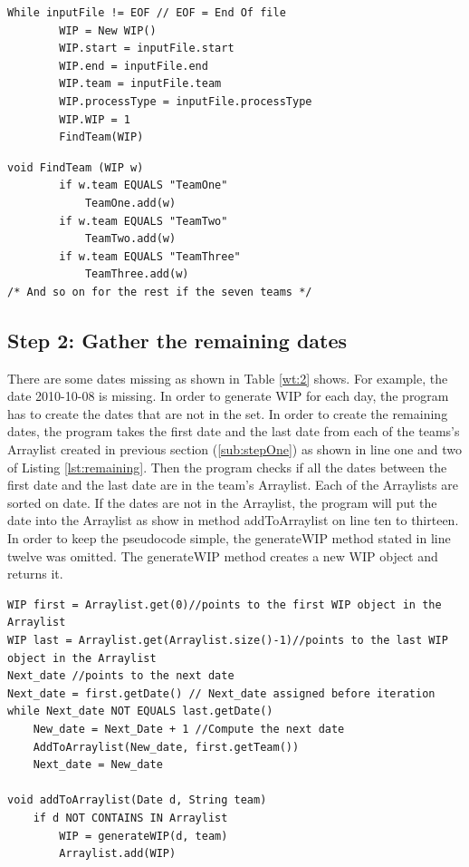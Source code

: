 \documentclass[UKenglish]{ifimaster}  %
\begin{document}
\begin{minipage}{\textwidth} 
 \begin{lstlisting}[caption={Gather all unique dates into Arraylist},label={lst:Arraylist}]
While inputFile != EOF // EOF = End Of file
		WIP = New WIP()
		WIP.start = inputFile.start
		WIP.end = inputFile.end
		WIP.team = inputFile.team
		WIP.processType = inputFile.processType
		WIP.WIP = 1
		FindTeam(WIP)
 \end{lstlisting}
 \end{minipage}

 
 \begin{lstlisting}[caption={Gather WIP object to the right data structure},label={lst:addWIP}]
void FindTeam (WIP w) 
		if w.team EQUALS "TeamOne"
			TeamOne.add(w)
		if w.team EQUALS "TeamTwo"
			TeamTwo.add(w)
		if w.team EQUALS "TeamThree"
			TeamThree.add(w)			
/* And so on for the rest if the seven teams */
 \end{lstlisting}
 
 \newpage
\subsection{Step 2: Gather the remaining dates}
 \label{sub:stepTwo}
There are some dates missing as shown in Table \ref{wt:2} shows. For example, the date 2010-10-08 is missing. In order to generate WIP for each day, the program has to create the dates that are not in the set. In order to create the remaining dates, the program takes the first date and the last date from each of the teams's Arraylist created in previous section (\ref{sub:stepOne}) as shown in line one and two of Listing \ref{lst:remaining}. Then the program checks if all the dates between the first date and the last date are in the team's Arraylist. Each of the Arraylists are sorted on date. If the dates are not in the Arraylist, the program will put the date into the Arraylist as show in method addToArraylist on line ten to thirteen.
In order to keep the pseudocode simple, the generateWIP method stated in line twelve was omitted. The generateWIP method creates a new WIP object and returns it.



\begin{lstlisting}[caption={Gather the remaining dates.},label={lst:remaining}]
WIP first = Arraylist.get(0)//points to the first WIP object in the Arraylist 
WIP last = Arraylist.get(Arraylist.size()-1)//points to the last WIP object in the Arraylist 
Next_date //points to the next date
Next_date = first.getDate() // Next_date assigned before iteration
while Next_date NOT EQUALS last.getDate()
	New_date = Next_Date + 1 //Compute the next date
	AddToArraylist(New_date, first.getTeam())
	Next_date = New_date

void addToArraylist(Date d, String team)
	if d NOT CONTAINS IN Arraylist
		WIP = generateWIP(d, team)
		Arraylist.add(WIP) 
 \end{lstlisting}
\end{document}

